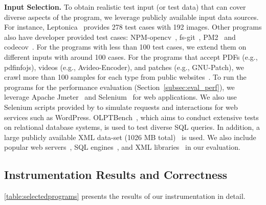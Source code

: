 \noindent
{\bf Input Selection.}
To obtain realistic test input (or test data) that can cover diverse aspects of the program, we leverage publicly available input data sources. %
For instance, Leptonica~\cite{Leptonica} provides 278 test cases with 192 images. 
Other programs also have developer provided test cases: NPM-opencv~\cite{opencv}, fs-git~\cite{fs-git}, PM2~\cite{PM2} and codecov~\cite{codecov}. For the programs with less than 100 test cases, we extend them on different inputs with around 100 cases. 
%
For the programs that accept PDFs (e.g., pdfinfojs), videos (e.g., Avideo-Encoder), and patches (e.g., GNU-Patch), we crawl more than 100 samples for each type from public websites~\cite{tpn-pdf, ted-video}.
To run the programs for the performance evaluation (Section~\ref{subsec:eval_perf}), we leverage Apache Jmeter~\cite{apachejmeter} and Selenium~\cite{selenium} for web applications. We also use Selenium scripts provided by \cite{sec19-selenium} to simulate requests and interactions for web services such as WordPress. 
OLPTBench~\cite{difallah2013oltp}, which aims to conduct extensive tests on relational database systems, is used to test diverse SQL queries. 
In addition, a large publicly available XML data-set (1026 MB total)~\cite{xmldata} is used.
We also include popular web servers~\cite{apache,lighttpd,OpenLightSpeed,Cherokee}, SQL engines~\cite{sqlite,Mysql}, and XML libraries~\cite{libxml,simplexml,libxmljs,luaexpat} in our evaluation. %


\subsection{Instrumentation Results and Correctness}
\label{subsec:instr}
\autoref{table:selectedprograms} presents the results of our instrumentation in detail.

